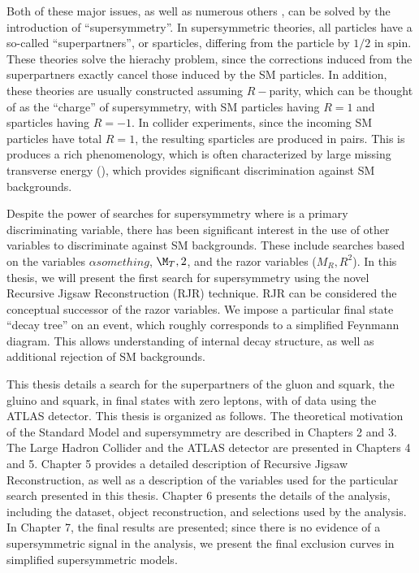 Both of these major issues, as well as numerous others , can be solved by the introduction of ``supersymmetry''.
In supersymmetric theories, all particles have a so-called ``superpartners'', or sparticles, differing from the particle by $1/2$ in spin.
These theories solve the hierachy problem, since the corrections induced from the superpartners exactly cancel those induced by the SM particles.
In addition, these theories are usually constructed assuming $R-$parity, which can be thought of as the ``charge'' of supersymmetry, with SM particles having $R=1$ and sparticles having $R=-1$.
In collider experiments, since the incoming SM particles have total $R=1$, the resulting sparticles are produced in pairs.
This is produces a rich phenomenology, which is often characterized by large missing transverse energy (\met), which provides significant discrimination against SM backgrounds.

Despite the power of searches for supersymmetry where \met is a primary discriminating variable, there has been significant interest in the use of other variables to discriminate against SM backgrounds.
These include searches based on the variables $\alpha{something}$, $ \M_T,2$, and the razor variables ($M_R, R^2$). 
In this thesis, we will present the first search for supersymmetry using the novel Recursive Jigsaw Reconstruction (RJR) technique.
RJR can be considered the conceptual successor of the razor variables.
We impose a particular final state ``decay tree'' on an event, which roughly corresponds to a simplified Feynmann diagram.
This allows understanding of internal decay structure, as well as additional rejection of SM backgrounds.

This thesis details a search for the superpartners of the gluon and squark, the gluino and squark, in final states with zero leptons, with \todo{ 7 \ifb} of data using the ATLAS detector.
This thesis is organized as follows.
The theoretical motivation of the Standard Model and supersymmetry are described in Chapters 2 and 3.
The Large Hadron Collider and the ATLAS detector are presented in Chapters 4 and 5.
Chapter 5 provides a detailed description of Recursive Jigsaw Reconstruction, as well as a description of the variables used for the particular search presented in this thesis.
Chapter 6 presents the details of the analysis, including the dataset, object reconstruction, and selections used by the analysis.
In Chapter 7, the final results are presented; since there is no evidence of a supersymmetric signal in the analysis, we present the final exclusion curves in simplified supersymmetric models.

